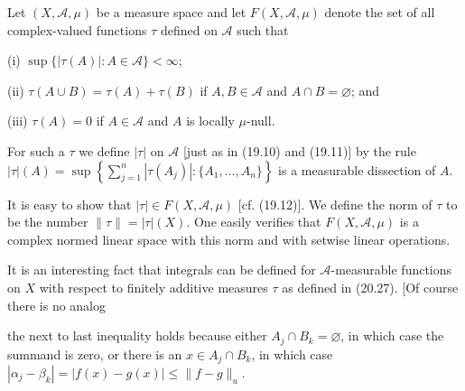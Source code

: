 Let $(X, \mathcal{A}, \mu)$ be a measure space and let $F(X, \mathcal{A}, \mu)$ denote the set of all complex-valued functions $\tau$ defined on $\mathcal{A}$ such that

(i) $\sup\{|\tau(A)| : A \in \mathcal{A}\} < \infty$;

(ii) $\tau(A \cup B) = \tau(A) + \tau(B)$ if $A, B \in \mathcal{A}$ and $A \cap B = \varnothing$; and

(iii) $\tau(A) = 0$ if $A \in \mathcal{A}$ and $A$ is locally $\mu$-null.

For such a $\tau$ we define $|\tau|$ on $\mathcal{A}$ [just as in (19.10) and (19.11)] by the rule $|\tau|(A) = \sup\left\{\sum_{j=1}^{n}|\tau(A_j)| : \{A_1, \ldots, A_n\}\right\}$ is a measurable dissection of $A$.

It is easy to show that $|\tau| \in F(X, \mathcal{A}, \mu)$ [cf. (19.12)]. We define the norm of $\tau$ to be the number $\|\tau\| = |\tau|(X)$. One easily verifies that $F(X, \mathcal{A}, \mu)$ is a complex normed linear space with this norm and with setwise linear operations.

It is an interesting fact that integrals can be defined for $\mathcal{A}$-measurable functions on $X$ with respect to finitely additive measures $\tau$ as defined in (20.27). [Of course there is no analog

the next to last inequality holds because either $A_j \cap B_k = \varnothing$, in which case the summand is zero, or there is an $x \in A_j \cap B_k$, in which case $|\alpha_j - \beta_k| = |f(x) - g(x)| \leq \|f - g\|_u$.
